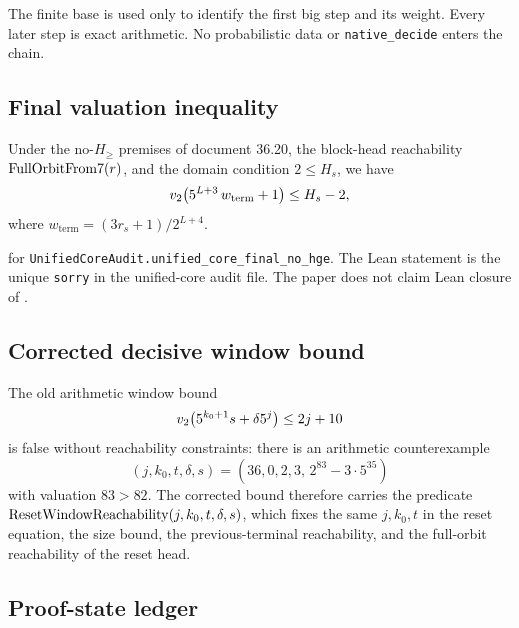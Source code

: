 The finite base is used only to identify the first big step and its
weight.  Every later step is exact arithmetic.  No probabilistic data
or \texttt{native\_decide} enters the chain.

\subsection{Final valuation inequality}

\begin{theorem}\label{thm:core}
Under the no-$H_{\ge}$ premises of document 36.20, the block-head
reachability $\mathrm{FullOrbitFrom7}(r)$, and the domain condition $2\le H_s$, we
have
\begin{equation*}
  v_2\!\left(5^{L+3}\,w_{\mathrm{term}}+1\right)\le H_s-2,
\end{equation*}
where $w_{\mathrm{term}}=(3r_s+1)/2^{L+4}$.
\end{theorem}

\begin{remark}
\statusmath{}
\statuspending{} for
\texttt{UnifiedCoreAudit.unified\_core\_final\_no\_hge}.
The Lean statement is the unique \texttt{sorry} in the unified-core
audit file.
The paper does not claim Lean closure of .
\end{remark}

\subsection{Corrected decisive window bound}

The old arithmetic window bound
\begin{equation*}
  v_2\!\left(5^{k_0+1}s+\delta 5^j\right)\le 2j+10
\end{equation*}
is false without reachability constraints: there is an arithmetic
counterexample
\begin{equation*}
  (j,k_0,t,\delta,s)=(36,0,2,3,\,2^{83}-3\cdot5^{35})
\end{equation*}
with valuation $83>82$.  The corrected bound therefore carries the
predicate $\mathrm{ResetWindowReachability}(j,k_0,t,\delta,s)$, which fixes the same
$j,k_0,t$ in the reset equation, the size bound, the previous-terminal
reachability, and the full-orbit reachability of the reset head.

\subsection{Proof-state ledger}

